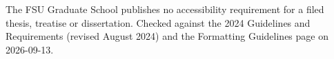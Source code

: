 %

%

%
	{The FSU Graduate School publishes no accessibility requirement for a filed
	 thesis, treatise or dissertation. Checked against the 2024 Guidelines and
	 Requirements (revised August 2024) and the Formatting Guidelines page on
	 2026-09-13.}

